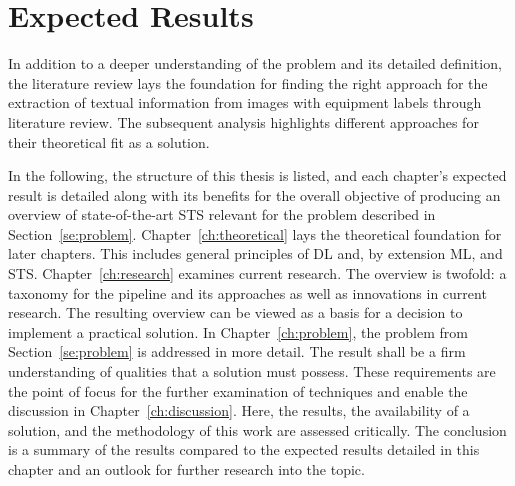 \section{Expected Results}
In addition to a deeper understanding of the problem and its detailed definition, the literature
review lays the foundation for finding the right approach for the extraction of textual
information from images with equipment labels through literature review.
The subsequent analysis highlights different approaches for their theoretical fit as a
solution.

In the following, the structure of this thesis is listed, and each chapter's expected
result is detailed along with its benefits for the overall objective of producing an overview of
state-of-the-art \ac{STS} relevant for the problem described in Section~\ref{se:problem}.
Chapter~\ref{ch:theoretical} lays the theoretical foundation for later chapters.
This includes general principles of \ac{DL} and, by extension \ac{ML}, and \ac{STS}.
Chapter~\ref{ch:research} examines current research.
The overview is twofold: a taxonomy for the pipeline and its approaches as well as innovations in
current research.
The resulting overview can be viewed as a basis for a decision to implement a
practical solution.
In Chapter~\ref{ch:problem}, the problem from Section~\ref{se:problem} is addressed in more detail.
The result shall be a firm understanding of qualities that a solution must possess.
These requirements are the point of focus for the further examination of techniques and
enable the discussion in Chapter~\ref{ch:discussion}.
Here, the results, the availability of a solution, and the methodology of this work
are assessed critically.
The conclusion is a summary of the results compared to the expected results detailed in this chapter
and an outlook for further research into the topic.
